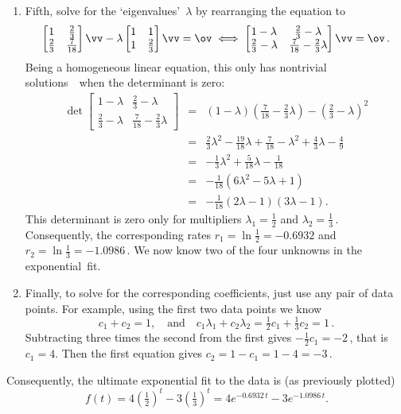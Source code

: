 \begin{draft}
\begin{example}
\begin{solution}
\begin{enumerate}
\item \label{eg:2expfite}
Fifth, solve for the `eigenvalues'~\(\lambda\) by rearranging the equation to
\begin{equation*}
\begin{bmatrix} 1&\tfrac23\\\tfrac23&\frac7{18} \end{bmatrix}\vv-\lambda\begin{bmatrix} 1&1\\1&\tfrac23 \end{bmatrix}\vv=\ov
\iff
\begin{bmatrix} 1-\lambda&\tfrac23-\lambda\\\tfrac23-\lambda&\frac7{18}-\tfrac23\lambda\end{bmatrix}\vv=\ov\,.
\end{equation*}
Being a homogeneous linear equation, this only has nontrivial solutions~\vv\ when the determinant is zero:
\begin{eqnarray*}
\det\begin{bmatrix} 1-\lambda&\tfrac23-\lambda\\\tfrac23-\lambda&\frac7{18}-\tfrac23\lambda\end{bmatrix}
&=&(1-\lambda)(\tfrac7{18}-\tfrac23\lambda)-(\tfrac23-\lambda)^2
\\&=&\tfrac23\lambda^2-\tfrac{19}{18}\lambda+\tfrac7{18}
-\lambda^2+\tfrac43\lambda-\tfrac49
\\&=&-\tfrac13\lambda^2+\tfrac5{18}\lambda-\tfrac1{18}
\\&=&-\tfrac1{18}(6\lambda^2-5\lambda+1)
\\&=&-\tfrac1{18}(2\lambda-1)(3\lambda-1).
\end{eqnarray*}
This determinant is zero only for multipliers \(\lambda_1=\tfrac12\) and \(\lambda_2=\tfrac13\)\,. 
Consequently, the corresponding rates \(r_1=\ln\tfrac12=-0.6932\) and \(r_2=\ln\tfrac13=-1.0986\)\,.
We now know two of the four unknowns in the exponential~fit.

\item \label{eg:2expfitf}
Finally, to solve for the corresponding coefficients, just use any pair of data points.
For example, using the first two data points we know
\begin{equation*}
c_1+c_2=1,\quad\text{and}\quad
c_1\lambda_1+c_2\lambda_2=\tfrac12c_1+\tfrac13c_2=1\,.
\end{equation*}
Subtracting three times the second from the first gives \(-\tfrac12c_1=-2\)\,, that is \(c_1=4\).
Then the first equation gives \(c_2=1-c_1=1-4=-3\)\,.
\end{enumerate}
Consequently, the ultimate exponential fit to the data is (as previously plotted)
\begin{equation*}
f(t)=4(\tfrac12)^t-3(\tfrac13)^t
=4e^{-0.6932\,t}-3e^{-1.0986\,t}.
\end{equation*}
\end{solution}
\end{example}



\end{draft}

